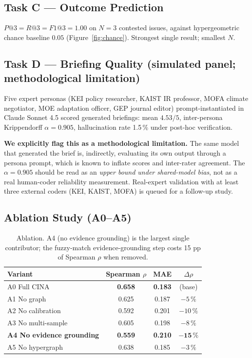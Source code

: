 \documentclass[11pt,a4paper]{article}
\begin{document}
\subsection{Task C --- Outcome Prediction}
$P@3 = R@3 = F1@3 = 1.00$ on $N=3$ contested issues, against hypergeometric chance baseline $0.05$ (Figure~\ref{fig:chance}). Strongest single result; smallest $N$.

\subsection{Task D --- Briefing Quality (simulated panel; methodological limitation)}
\label{sec:eval-d}

Five expert personas (KEI policy researcher, KAIST IR professor, MOFA climate negotiator, MOE adaptation officer, GEP journal editor) prompt-instantiated in Claude Sonnet 4.5 scored generated briefings: mean $4.53/5$, inter-persona Krippendorff $\alpha = 0.905$, hallucination rate 1.5\,\% under post-hoc verification.

\textbf{We explicitly flag this as a methodological limitation.} The same model that generated the brief is, indirectly, evaluating its own output through a persona prompt, which is known to inflate scores and inter-rater agreement. The $\alpha = 0.905$ should be read as an \emph{upper bound under shared-model bias}, not as a real human-coder reliability measurement. Real-expert validation with at least three external coders (KEI, KAIST, MOFA) is queued for a follow-up study.

\subsection{Ablation Study (A0--A5)}

\begin{table}[ht]
\centering
\small
\begin{tabular}{lccc}
\toprule
Variant & Spearman $\rho$ & MAE & $\Delta\rho$ \\ \midrule
A0 Full CINA & \textbf{0.658} & \textbf{0.183} & (base) \\
A1 No graph & 0.625 & 0.187 & $-5\,\%$ \\
A2 No calibration & 0.592 & 0.201 & $-10\,\%$ \\
A3 No multi-sample & 0.605 & 0.198 & $-8\,\%$ \\
\textbf{A4 No evidence grounding} & \textbf{0.559} & \textbf{0.210} & $\mathbf{-15\,\%}$ \\
A5 No hypergraph & 0.638 & 0.185 & $-3\,\%$ \\
\bottomrule
\end{tabular}
\caption{Ablation. A4 (no evidence grounding) is the largest single contributor; the fuzzy-match evidence-grounding step costs 15 pp of Spearman $\rho$ when removed.}
\end{table}
\end{document}
